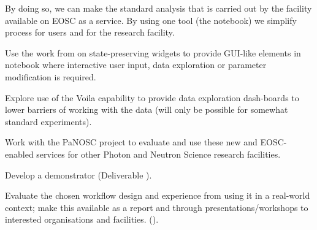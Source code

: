 \begin{task}[
  title=Reproducible photon science workflows at European XFEL,
  id=reproducibility-xfel,
  lead=XFEL,
  PM=36,
  wphases={7-48},
  partners={INSERM,SRL,UPSUD}
  ]
\begin{compactitem}
    By doing so, we can make the standard analysis that is carried out
    by the facility available on EOSC as a service. By using one tool
    (the notebook) we simplify process for users and for the research
    facility.

  \item Use the work from  on
    state-preserving widgets to provide GUI-like elements in notebook
    where interactive user input, data exploration or parameter
    modification is required.

  \item Explore use of the Voila capability to provide
    data exploration dash-boards to lower barriers of working with the
    data (will only be possible for somewhat standard experiments).

  \item Work with the PaNOSC project \cite{panosc} to evaluate and use
    these new and EOSC-enabled services for other Photon and Neutron
    Science research facilities.
  \item Develop a demonstrator (Deliverable ).

  \item Evaluate the chosen workflow design and experience from using
    it in a real-world context; make this available as a report and
    through presentations/workshops to interested organisations and
    facilities. ().




  \end{compactitem}

 \end{task}
